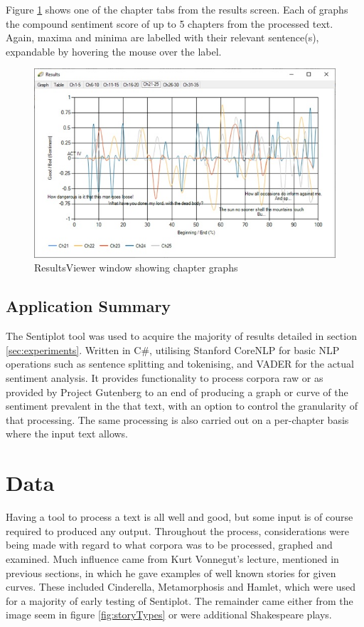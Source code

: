 \documentclass{article}
\begin{document}
        Figure \ref{fig:resultschapters} shows one of the chapter tabs from the results screen. Each of graphs the compound sentiment score of up to 5 chapters from the processed text. Again, maxima and minima are labelled with their relevant sentence(s), expandable by hovering the mouse over the label.
        \begin{figure}[htbp]
            \includegraphics[width=1\textwidth]{Figures/Misc/resultschapters}
            \caption{ResultsViewer window showing chapter graphs}
            \label{fig:resultschapters}
        \end{figure}
    \subsection{Application Summary}
        The Sentiplot tool was used to acquire the majority of results detailed in section \ref{sec:experiments}. Written in C\#, utilising Stanford CoreNLP for basic NLP operations such as sentence splitting and tokenising, and VADER for the actual sentiment analysis. It provides functionality to process corpora raw or as provided by Project Gutenberg to an end of producing a graph or curve of the sentiment prevalent in the that text, with an option to control the granularity of that processing. The same processing is also carried out on a per-chapter basis where the input text allows.
\newpage
\section{Data}
    Having a tool to process a text is all well and good, but some input is of course required to produced any output. Throughout the process, considerations were being made with regard to what corpora was to be processed, graphed and examined. Much influence came from Kurt Vonnegut's lecture, mentioned in previous sections, in which he gave examples of well known stories for given curves. These included Cinderella, Metamorphosis and Hamlet, which were used for a majority of early testing of Sentiplot. The remainder came either from the image seem in figure \ref{fig:storyTypes} or were additional Shakespeare plays.
\end{document}
